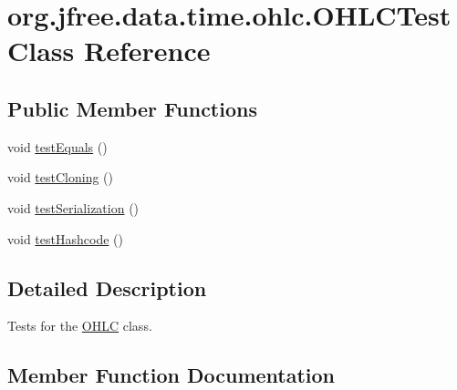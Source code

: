 \hypertarget{classorg_1_1jfree_1_1data_1_1time_1_1ohlc_1_1_o_h_l_c_test}{}\section{org.\+jfree.\+data.\+time.\+ohlc.\+O\+H\+L\+C\+Test Class Reference}
\label{classorg_1_1jfree_1_1data_1_1time_1_1ohlc_1_1_o_h_l_c_test}
\subsection*{Public Member Functions}
\begin{DoxyCompactItemize}
\item 
void \mbox{\hyperlink{classorg_1_1jfree_1_1data_1_1time_1_1ohlc_1_1_o_h_l_c_test_a963a2963f2855a4ff73dc1e36ac2b9e5}{test\+Equals}} ()
\item 
void \mbox{\hyperlink{classorg_1_1jfree_1_1data_1_1time_1_1ohlc_1_1_o_h_l_c_test_a0dcca0e2f1fc5723e41504f1b037d7cd}{test\+Cloning}} ()
\item 
void \mbox{\hyperlink{classorg_1_1jfree_1_1data_1_1time_1_1ohlc_1_1_o_h_l_c_test_a73d2fc8987890443b1c7001639463cee}{test\+Serialization}} ()
\item 
void \mbox{\hyperlink{classorg_1_1jfree_1_1data_1_1time_1_1ohlc_1_1_o_h_l_c_test_ab20cd91f27dda230f4b6b2915bc0fc88}{test\+Hashcode}} ()
\end{DoxyCompactItemize}


\subsection{Detailed Description}
Tests for the \mbox{\hyperlink{classorg_1_1jfree_1_1data_1_1time_1_1ohlc_1_1_o_h_l_c}{O\+H\+LC}} class. 

\subsection{Member Function Documentation}
\mbox{\label{classorg_1_1jfree_1_1data_1_1time_1_1ohlc_1_1_o_h_l_c_test_a0dcca0e2f1fc5723e41504f1b037d7cd}} 
